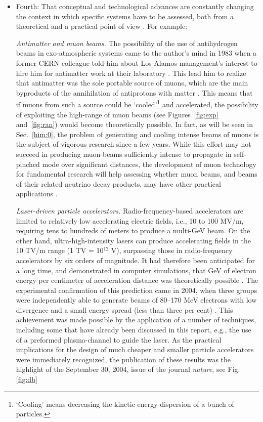 \documentclass [12pt,a4paper,     ]{report} %
\begin{document}
\begin{itemize}
\item Fourth: That conceptual and technological advances are constantly changing the context in which specific systems have to be assessed, both from a theoretical and a practical point of view \cite{GSPON2000-}.  For example: 


\emph{Antimatter and muon beams.} The possibility of the use of antihydrogen beams in exo-atmospheric systems came to the author's mind in 1983 when a former CERN colleague told him about Los Alamos management's interest to hire him for antimatter work at their laboratory \cite{GRINE1984-}.  This lead him to realize that antimatter was the sole portable source of muons, which are the main byproducts of the annihilation of antiprotons with matter \cite{GSPON1987B}.  This means that if muons from such a source could be `cooled'\footnote{`Cooling' means decreasing the kinetic energy dispersion of a bunch of particles.} and accelerated, the possibility of exploiting the high-range of muon beams (see Figures~\ref{fig:exp} and~\ref{fig:ran}) would become theoretically possible.  In fact, as will be seen in Sec.~\ref{him:0}, the problem of generating and cooling intense beams of muons is the subject of vigorous research since a few years.  While this effort may not succeed in producing muon-beams sufficiently intense to propagate in self-pinched mode over significant distances, the development of muon technology for fundamental research will help assessing whether muon beams, and beams of their related neutrino decay products, may have other practical applications \cite{AMALD1999-,DETWI2002-}.


\emph{Laser-driven particle accelerators.}  Radio-frequency-based accelerators are limited to relatively low accelerating electric fields, i.e., 10 to 100 MV/m, requiring tens to hundreds of meters to produce a multi-GeV beam.  On the other hand, ultra-high-intensity lasers can produce accelerating fields in the 10 TV/m range (1 TV = 10$^{12}$ V), surpassing those in radio-frequency accelerators by six orders of magnitude.  It had therefore been anticipated for a long time, and demonstrated in computer simulations, that GeV of electron energy per centimeter of acceleration distance was theoretically possible \cite{TAJIM1979-}.  The experimental confirmation of this prediction came in 2004, when three groups were independently able to generate beams of 80--170 MeV electrons with low divergence and a small energy spread (less than three per cent) \cite{MANGL2004-,GEDDE2004-,FAURE2004-}.  This achievement was made possible by the application of a number of techniques, including some that have  already been discussed in this report, e.g., the use of a preformed plasma-channel to guide the laser. As the practical implications for the design of much cheaper and smaller particle accelerators were immediately recognized, the publication of these results was the highlight of the September 30, 2004, issue of the journal \emph{nature}, see Fig.\,\ref{fig:db}


\end{itemize}
\end{document}

